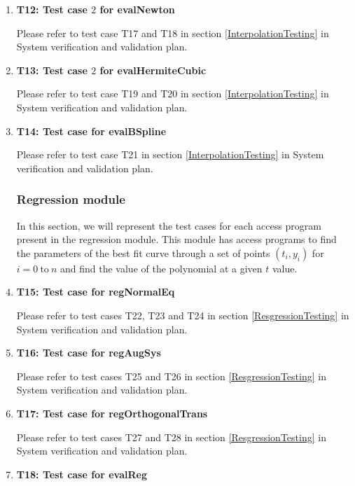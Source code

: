 \documentclass[12pt, titlepage]{article}
\begin{document}
\begin{enumerate}
\item{\textbf{T12: Test case $2$ for evalNewton}}

Please refer to test case T17 and T18 in section \ref{InterpolationTesting} in 
System 
verification and validation plan.


\item{\textbf{T13: Test case $2$ for evalHermiteCubic}}

Please refer to test case T19 and T20 in section \ref{InterpolationTesting} in 
System 
verification and validation plan.


\item{\textbf{T14: Test case for evalBSpline}}

Please refer to test case T21 in section \ref{InterpolationTesting} in System 
verification and validation plan.





\subsubsection{Regression module}

In this section, we will represent the test cases for each access program 
present in the regression module. This module has access programs to find 
the parameters of the best fit curve through a set of points $(t_i,y_i)$ 
for $i = 0\ \text{to}\ n$ and find the value of the polynomial at a given $t$ 
value.



\item{\textbf{T15: Test case for regNormalEq}}

Please refer to test cases T22, T23 and T24 in section \ref{ResgressionTesting} 
in 
System verification 
and 
validation plan.


\item{\textbf{T16: Test case for regAugSys}}

Please refer to test cases T25 and T26 in section \ref{ResgressionTesting} in 
System verification 
and 
validation plan.


\item{\textbf{T17: Test case for regOrthogonalTrans}}

Please refer to test cases T27 and T28 in section \ref{ResgressionTesting} in 
System verification 
and 
validation plan.

\item{\textbf{T18: Test case for evalReg}}


\end{enumerate}
\end{document}
